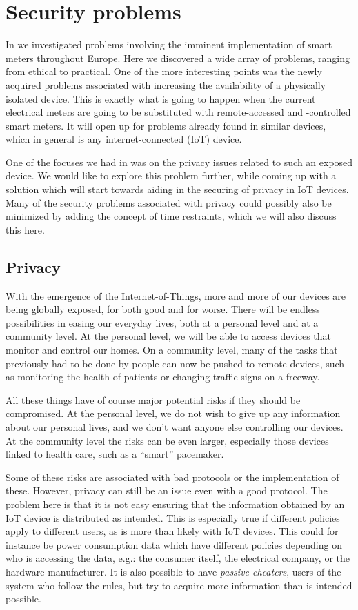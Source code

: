 
\section{Security problems}
In \cite{prespecialization} we investigated problems involving the imminent implementation of smart meters throughout Europe.
Here we discovered a wide array of problems, ranging from ethical to practical.
One of the more interesting points was the newly acquired problems associated with increasing the availability of a physically isolated device.
This is exactly what is going to happen when the current electrical meters are going to be substituted with remote-accessed and -controlled smart meters.
It will open up for problems already found in similar devices, which in general is any internet-connected (IoT) device.

One of the focuses we had in \cite{prespecialization} was on the privacy issues related to such an exposed device.
We would like to explore this problem further, while coming up with a solution which will start towards aiding in the securing of privacy in IoT devices.
Many of the security problems associated with privacy could possibly also be minimized by adding the concept of time restraints, which we will also discuss this here.

\subsection{Privacy}
With the emergence of the Internet-of-Things, more and more of our devices are being globally exposed, for both good and for worse.
There will be endless possibilities in easing our everyday lives, both at a personal level and at a community level.
At the personal level, we will be able to access devices that monitor and control our homes.
On a community level, many of the tasks that previously had to be done by people can now be pushed to remote devices, such as monitoring the health of patients or changing traffic signs on a freeway.

All these things have of course major potential risks if they should be compromised.
At the personal level, we do not wish to give up any information about our personal lives, and we don't want anyone else controlling our devices.
At the community level the risks can be even larger, especially those devices linked to health care, such as a ``smart'' pacemaker.

Some of these risks are associated with bad protocols or the implementation of these.
However, privacy can still be an issue even with a good protocol.
The problem here is that it is not easy ensuring that the information obtained by an IoT device is distributed as intended.
This is especially true if different policies apply to different users, as is more than likely with IoT devices.
This could for instance be power consumption data which have different policies depending on who is accessing the data, e.g.: the consumer itself, the electrical company, or the hardware manufacturer.
It is also possible to have \emph{passive cheaters}, users of the system who follow the rules, but try to acquire more information than is intended possible.

